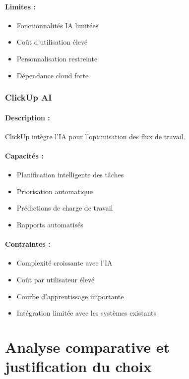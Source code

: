 \paragraph{Limites :}
\begin{itemize}
    \item Fonctionnalités IA limitées
    \item Coût d'utilisation élevé
    \item Personnalisation restreinte
    \item Dépendance cloud forte
\end{itemize}

\subsubsection{ClickUp AI}
\paragraph{Description :} ClickUp intègre l'IA pour l'optimisation des flux de travail.

\paragraph{Capacités :}
\begin{itemize}
    \item Planification intelligente des tâches
    \item Priorisation automatique
    \item Prédictions de charge de travail
    \item Rapports automatisés
\end{itemize}

\paragraph{Contraintes :}
\begin{itemize}
    \item Complexité croissante avec l'IA
    \item Coût par utilisateur élevé
    \item Courbe d'apprentissage importante
    \item Intégration limitée avec les systèmes existants
\end{itemize}

\section{Analyse comparative et justification du choix}

